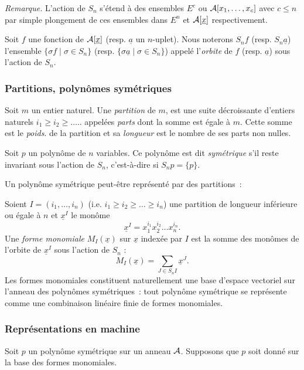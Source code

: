\documentclass[11pt]{article}
\begin{document}
{\it Remarque.} L'action de $S_n$ s'\'etend \`a des ensembles $E^c$
ou ${\cal A}[x_1,\ldots ,x_c]$ avec $c \leq n$ par simple 
plongement de ces ensembles dans $E^n$ et ${\cal A}[\underline x]$ 
respectivement.

Soit $f$ une fonction de ${\cal A}[\underline x]$ (resp. $\underline a$ un
$n$-uplet). Nous noterons $S_nf$ (resp. $S_n \underline a$) l'ensemble
$\{\sigma f \;|\; \sigma \in S_n \}$ (resp. $\{\sigma\underline a \;|\;
 \sigma
\in S_n \}$) appel\'e l'{\it orbite} de $f$ (resp. $\underline a$)
sous l'action de $S_n$.

\subsubsection*{Partitions, polyn\^omes sym\'etriques}

Soit $m$ un entier naturel.
Une {\it partition} de $m$, est une suite 
d\'ecroissante d'entiers naturels $i_1\geq i_2 \geq \ldots..$ appel\'ees 
{\it parts} dont la somme est \'egale \`a $m$. Cette somme est le {\it poids}.
de la partition et sa {\it longueur} est le nombre de ses parts non nulles.

Soit $p$ un polyn\^ome de $n$ variables. Ce polyn\^ome est dit {\it
sym\'etrique} s'il reste invariant sous l'action de $S_n$, c'est-\`a-dire si
$S_n p =\{
p\}$.

Un polyn\^ome sym\'etrique peut-\^etre repr\'esent\'e par des
partitions~: 


Soient $I=(i_1,\ldots ,i_n)$ (i.e. $i_1\geq i_2\geq \ldots \geq i_n$)
une partition de longueur inf\'erieure ou
\'egale \`a $n$ et ${\underline x}^I$ le mon\^ome 
$$
{\underline x}^I = x_1^{i_1}x_2^{i_2}\ldots x_n^{i_n}.
$$
Une {\it forme monomiale} $M_I({\underline x})$ sur ${\underline x}$ 
index\'ee par $I$ est la somme des mon\^omes de l'orbite de
${\underline x}^I$ sous l'action de $S_n$ :
$$
M_I({\underline x}) =\sum_{J \in S_nI}{\underline x}^J.
$$
Les formes monomiales constituent naturellement une base d'espace vectoriel
sur l'anneau des polyn\^omes sym\'etriques~: tout
polyn\^ome sym\'etrique se repr\'esente comme une
combinaison lin\'eaire finie de formes monomiales.

\subsubsection*{Repr\'esentations en machine}

Soit $p$ un polyn\^ome sym\'etrique sur un anneau $\cal A$.
Supposons que $p$ soit donn\'e sur la base des formes monomiales.
\end{document}

